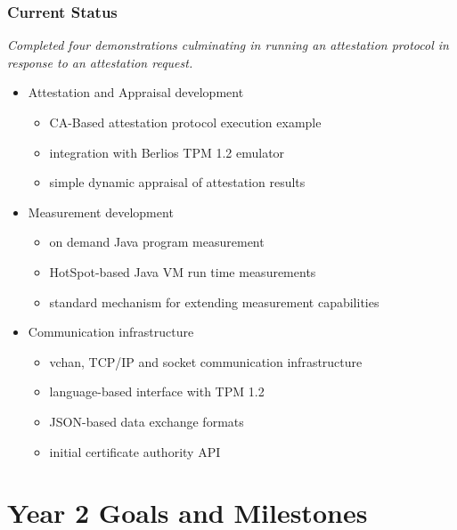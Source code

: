 \documentclass{beamer}
\begin{document}
\begin{frame}
  \frametitle{Current Status}

  \begin{center}
  \emph{\color{kublue}Completed four demonstrations culminating in
    running an attestation protocol in response to an attestation
    request.}
  \end{center}

  \begin{itemize}
  \item Attestation and Appraisal development
    \begin{itemize}
    \item CA-Based attestation protocol execution example
    \item integration with Berlios TPM 1.2 emulator
    \item simple dynamic appraisal of attestation results
    \end{itemize}
  \item Measurement development
    \begin{itemize}
    \item on demand Java program measurement
    \item HotSpot-based Java VM run time measurements
    \item standard mechanism for extending measurement capabilities
    \end{itemize}
  \item Communication infrastructure
    \begin{itemize}
    \item vchan, TCP/IP and socket communication infrastructure
    \item language-based interface with TPM 1.2
    \item JSON-based data exchange formats
    \item initial certificate authority API
    \end{itemize}
  \end{itemize}
\end{frame}

\section{Year 2 Goals and Milestones}
\end{document}
